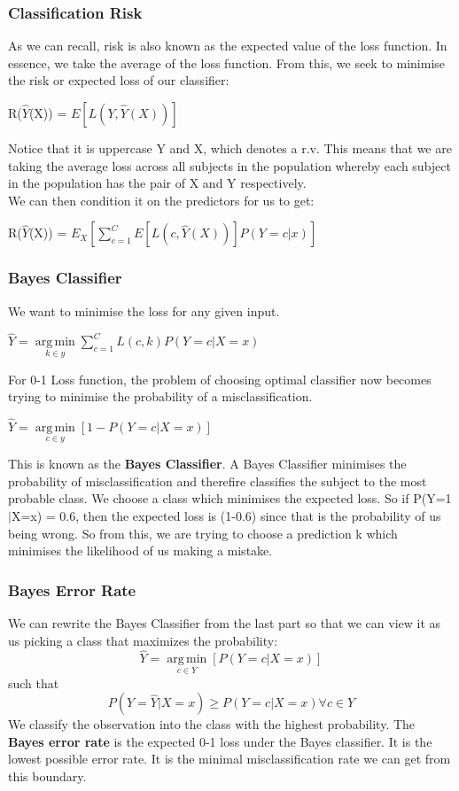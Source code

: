 \documentclass[11pt, oneside]{article}
\theoremstyle{definition}
\DeclareMathOperator*{\argmin}{arg\,min}
\begin{document}
\subsubsection{Classification Risk}
As we can recall, risk is also known as the expected value of the loss function. In essence, we take the average of the loss function. From this, we seek to minimise the risk or expected loss of our classifier:
\begin{center}
R($\hat{Y}$(X)) = $E[L(Y,\hat{Y} (X))]$
\end{center}
Notice that it is uppercase Y and X, which denotes a r.v. This means that we are taking the average loss across all subjects in the population whereby each subject in the population has the pair of X and Y respectively. \\
We can then condition it on the predictors for us to get:
\begin{center}
R($\hat{Y}$(X)) = $E_{X}[\sum\limits_{c=1}^{C}E[L(c,\hat{Y} (X))]P(Y=c|x)]$
\end{center}
\subsubsection{Bayes Classifier}
We want to minimise the loss for any given input.
\begin{center}
$\hat{Y} = \argmin\limits_{k \in y} \sum\limits_{c=1}^{C}L(c,k)P(Y=c|X=x)$
\end{center}
For 0-1 Loss function, the problem of choosing optimal classifier now becomes trying to minimise the probability of a misclassification.
\begin{center}
$\hat{Y} = \argmin\limits_{c\in y} [1-P(Y=c|X=x)]$
\end{center}
This is known as the \textbf{Bayes Classifier}. A Bayes Classifier minimises the probability of misclassification and therefire classifies the subject to the most probable class. We choose a class which minimises the expected loss. So if P(Y=1$|$X=x) = 0.6, then the expected loss is (1-0.6) since that is the probability of us being wrong. So from this, we are trying to choose a prediction k which minimises the likelihood of us making a mistake.

\subsubsection{Bayes Error Rate}
We can rewrite the Bayes Classifier from the last part so that we can view it as us picking a class that maximizes the probability:
$$
\hat{Y} = \argmin\limits_{c\in Y} [P(Y=c|X=x)]
$$
such that
$$
P(Y=\hat{Y}|X=x) \geq P(Y=c|X=x) \forall c \in Y
$$
We classify the observation into the class with the highest probability. The \textbf{Bayes error rate} is the expected 0-1 loss under the Bayes classifier. It is the lowest possible error rate. It is the minimal misclassification rate we can get from this boundary.
\end{document}
